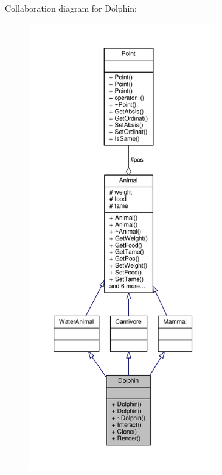 Collaboration diagram for Dolphin\+:
\nopagebreak
\begin{figure}[H]
\begin{center}
\leavevmode
\includegraphics[height=550pt]{classDolphin__coll__graph}
\end{center}
\end{figure}
